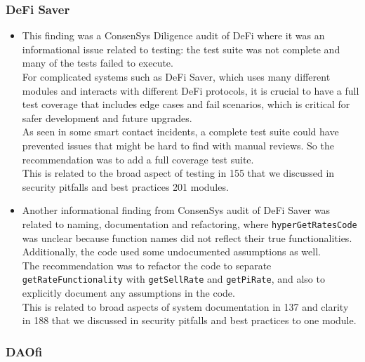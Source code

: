 \subsubsection{DeFi Saver}\label{defi-saver}

\begin{itemize}
\item
  This finding was a ConsenSys Diligence audit of DeFi where it was an
  informational issue related to testing: the test suite was not
  complete and many of the tests failed to execute.\\

  For complicated systems such as DeFi Saver, which uses many different
  modules and interacts with different DeFi protocols, it is crucial to
  have a full test coverage that includes edge cases and fail scenarios,
  which is critical for safer development and future upgrades.\\

  As seen in some smart contact incidents, a complete test suite could
  have prevented issues that might be hard to find with manual reviews.
  So the recommendation was to add a full coverage test suite.\\

  This is related to the broad aspect of testing in 155 that we
  discussed in security pitfalls and best practices 201 modules.
\item
  Another informational finding from ConsenSys audit of DeFi Saver was
  related to naming, documentation and refactoring, where
  \texttt{hyperGetRatesCode} was unclear because function names did not
  reflect their true functionalities. Additionally, the code used some
  undocumented assumptions as well.\\

  The recommendation was to refactor the code to separate
  \texttt{getRateFunctionality} with \texttt{getSellRate} and
  \texttt{getPiRate}, and also to explicitly document any assumptions in
  the code.\\

  This is related to broad aspects of system documentation in 137 and
  clarity in 188 that we discussed in security pitfalls and best
  practices to one module.
\end{itemize}

\subsubsection{DAOfi}\label{daofi}

